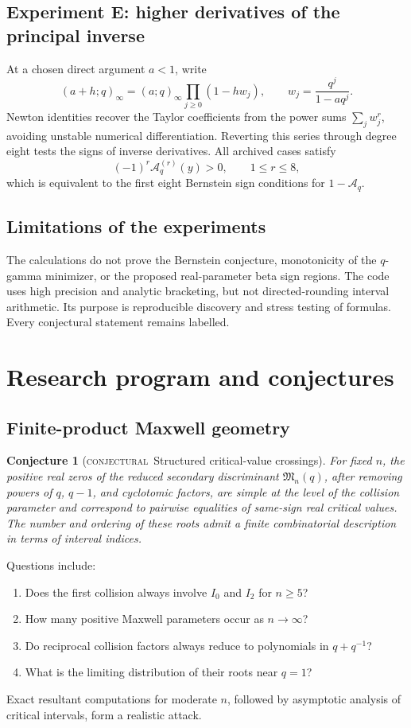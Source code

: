 \documentclass[11pt,oneside]{article}
\newtheorem{conjecture}[theorem]{Conjecture}
\theoremstyle{definition}
\theoremstyle{remark}
\theoremstyle{plain}
\theoremstyle{definition}
\theoremstyle{remark}
\newcommand{\Aq}{\mathcal A_q}
\newcommand{\statusconjectural}{\textcolor{conjectureorange}{\textsc{conjectural}}}
\numberwithin{equation}{section}
\numberwithin{figure}{section}
\numberwithin{table}{section}
\let\reporttopsection\section
\let\reportsubsection\subsection
\let\reportsubsubsection\subsubsection
\let\chapter\reporttopsection
\let\section\reportsubsection
\let\subsection\reportsubsubsection
\begin{document}
\section{Experiment E: higher derivatives of the principal inverse}
At a chosen direct argument \(a<1\), write
\[
 (a+h;q)_\infty=(a;q)_\infty
 \prod_{j\ge0}(1-hw_j),
 \qquad
 w_j=\frac{q^j}{1-aq^j}.
\]
Newton identities recover the Taylor coefficients from the power sums
\(\sum_jw_j^r\), avoiding unstable numerical differentiation.  Reverting this
series through degree eight tests the signs of inverse derivatives.  All
archived cases satisfy
\[
 (-1)^r\Aq^{(r)}(y)>0,
 \qquad 1\le r\le8,
\]
which is equivalent to the first eight Bernstein sign conditions for
\(1-\Aq\).

\section{Limitations of the experiments}
The calculations do not prove the Bernstein conjecture, monotonicity of the
\(q\)-gamma minimizer, or the proposed real-parameter beta sign regions.  The
code uses high precision and analytic bracketing, but not directed-rounding
interval arithmetic.  Its purpose is reproducible discovery and stress testing
of formulas.  Every conjectural statement remains labelled.

\chapter{Research program and conjectures}\label{chap:research}

\section{Finite-product Maxwell geometry}
\begin{conjecture}[\statusconjectural\ Structured critical-value crossings]
For fixed \(n\), the positive real zeros of the reduced secondary discriminant
\(\mathfrak M_n(q)\), after removing powers of \(q\), \(q-1\), and cyclotomic
factors, are simple at the level of the collision parameter and correspond to
pairwise equalities of same-sign real critical values.  The number and ordering
of these roots admit a finite combinatorial description in terms of interval
indices.
\end{conjecture}

Questions include:
\begin{enumerate}[label=(\alph*)]
\item Does the first collision always involve \(I_0\) and \(I_2\) for
\(n\ge5\)?
\item How many positive Maxwell parameters occur as \(n\to\infty\)?
\item Do reciprocal collision factors always reduce to polynomials in
\(q+q^{-1}\)?
\item What is the limiting distribution of their roots near \(q=1\)?
\end{enumerate}
Exact resultant computations for moderate \(n\), followed by asymptotic
analysis of critical intervals, form a realistic attack.
\end{document}
